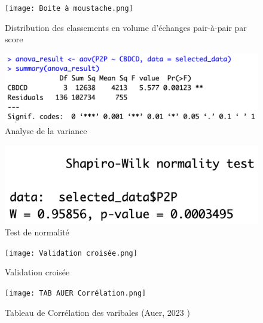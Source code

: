 \documentclass[12pt]{article}
\begin{document}
\begin{figure}
    \centering
    \texttt{[image: Boite à moustache.png]}
    \caption{Distribution des classements en volume d'échanges pair-à-pair par score}
    \label{fig:boxplot}
\end{figure}


\begin{figure}
    \centering
    \includegraphics[width=0.8\linewidth]{Anova .png}
    \caption{Analyse de la variance}
    \label{fig:Anova}
\end{figure}

\begin{figure}
    \centering
    \includegraphics[width=0.8\linewidth]{Shapiro-Wilk.png}
    \caption{Test de normalité}
    \label{fig:Test de normalité de Shapiro-Wilk}
\end{figure}

\clearpage

\begin{figure}
    \centering
    \texttt{[image: Validation croisée.png]}
    \caption{Validation croisée}
    \label{fig:validation croisee}
\end{figure}


\begin{figure}
    \centering
    \texttt{[image: TAB AUER Corrélation.png]}
    \caption{Tableau de Corrélation des varibales (Auer, 2023 \cite{RePEc:bis:biswps:880})}
    \label{fig:Tableau_de_Corrélation_des_varibales}
\end{figure}

\clearpage
\end{document}
